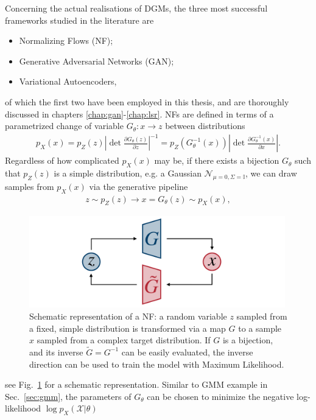 Concerning the actual realisations of DGMs, the three most successful frameworks studied in the literature are
\begin{itemize}
\item
Normalizing Flows (NF);
\item
Generative Adversarial Networks (GAN);
\item
Variational Autoencoders,
\end{itemize}
of which the first two have been employed in this thesis, and are thoroughly discussed in chapters \ref{chap:gan}-\ref{chap:lsr}. NFs are defined in terms of a parametrized change of variable $G_{\theta}: x \rightarrow z$ between distributions
%
\begin{align}\label{eq:nf}
p_X(x) = p_Z(z) \left|\det \frac{\partial G_{\theta}(z)}{\partial z}\right|^{-1} = p_Z(G_{\theta}^{-1}(x)) \left|\det \frac{\partial G_{\theta}^{-1}(x)}{\partial x}\right|.
\end{align}
%
Regardless of how complicated $p_{X}(x)$ may be, if there exists a bijection $G_{\theta}$ such that $p_Z(z)$ is a simple distribution, e.g. a Gaussian $\mathcal{N}_{\mu=0, \Sigma=\mathbb{I}}$, we can draw samples from $p_{X}(x)$ via the generative pipeline
%
\begin{align}
z \sim p_Z(z) \longrightarrow x = G_{\theta}(z)  \sim p_{X}(x),
\end{align}
%
%
\begin{figure}[t]
\centering
\includegraphics[page = 1, width=0.99\textwidth]{./figures/inn}
\caption{Schematic representation of a NF: a random variable $z$ sampled from a fixed, simple distribution is transformed via a map $G$ to a sample $x$ sampled from a complex target distribution. If $G$ is a bijection, and its inverse $\tilde{G} = G^{-1}$ can be easily evaluated, the inverse direction can be used to train the model with Maximum Likelihood.}
\label{fig:NF}
\end{figure}
%
see Fig.~\ref{fig:NF} for a schematic representation. Similar to GMM example in Sec.~\ref{sec:gmm}, the parameters of $G_{\theta}$ can be chosen to minimize the negative log-likelihood $\log p_{X}(\mathcal{X} | \theta)$ 
